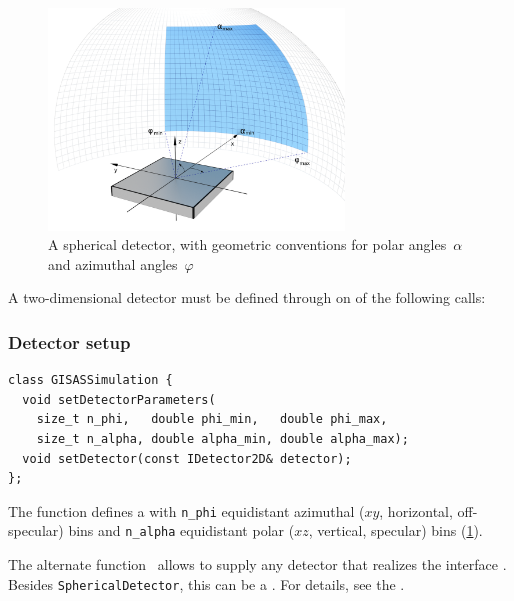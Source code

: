 \begin{figure}[tb]
\begin{center}
\includegraphics[width=0.7\textwidth]{fig/drawing/gisas_spherical_detector.png}
\end{center}
\caption{A spherical detector, with geometric conventions for polar angles~$\alpha$
and azimuthal angles~$\varphi$}
\label{FDetSpher}
\end{figure}

A two-dimensional detector must be defined through on of the following calls:

\subsubsection{Detector setup}\label{SRefDet}
\begin{lstlisting}
class GISASSimulation {
  void setDetectorParameters(
    size_t n_phi,   double phi_min,   double phi_max,
    size_t n_alpha, double alpha_min, double alpha_max);
  void setDetector(const IDetector2D& detector);
};
\end{lstlisting}
The function 
defines a 
%
with \texttt{n\_phi} equidistant azimuthal ($xy$, horizontal, off-specular) bins
%
%
%
%
and  \texttt{n\_alpha} equidistant polar ($xz$, vertical, specular) bins (\cref{FDetSpher}).
%
%
%
%

The alternate function~
allows to supply any detector that realizes the interface .
Besides \texttt{SphericalDetector}, this can be a .
For details, see the .


